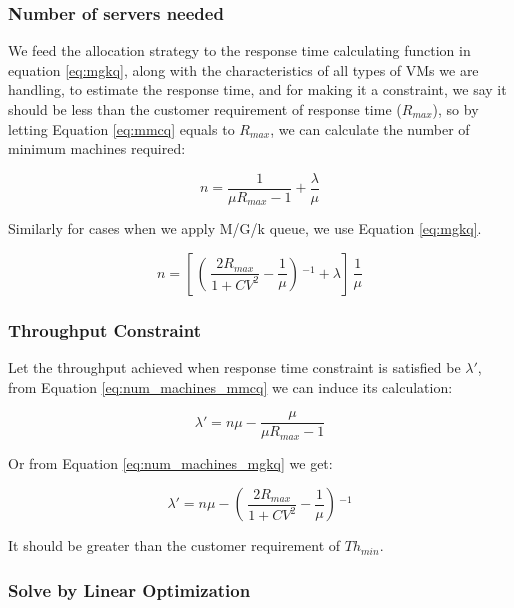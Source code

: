 \subsubsection{Number of servers needed}
We feed the allocation strategy to the response time calculating function in equation \eqref{eq:mgkq}, along with the characteristics of all types of VMs we are handling, to estimate the response time, and for making it a constraint, we say it should be less than the customer requirement of response time ($R_{max}$), so by letting Equation \ref{eq:mmcq} equals to $R_{max}$, we can calculate the number of minimum machines required:

\begin{equation} \label{eq:num_machines_mmcq}
n = \frac{1}{\mu R_{max} - 1} + \frac{\lambda}{\mu}
\end{equation}

Similarly for cases when we apply M/G/k queue, we use Equation \ref{eq:mgkq}.

\begin{equation} \label{eq:num_machines_mgkq}
n = [ \, ( \, \frac{2R_{max}}{1+CV^2} - \frac{1}{\mu} ) \,^{-1} + \lambda ] \, \frac{1}{\mu}
\end{equation}



\subsubsection{Throughput Constraint}

Let the throughput achieved when response time constraint is satisfied be $\lambda\prime$, from Equation \ref{eq:num_machines_mmcq} we can induce its calculation:

\begin{equation} \label{eq:throughput_mmcq}
\lambda\prime = n\mu - \frac{\mu}{\mu R_{max} - 1}
\end{equation} 

Or from Equation \ref{eq:num_machines_mgkq} we get:

\begin{equation} \label{eq:throughput_mgkq}
\lambda\prime = n \mu - ( \, \frac{ 2 R_{max} }{1+CV^2} - \frac{1}{\mu} ) \,^{-1}
\end{equation} 
            
It should be greater than the customer requirement of $Th_{min}$.



\subsubsection{Solve by Linear Optimization}


